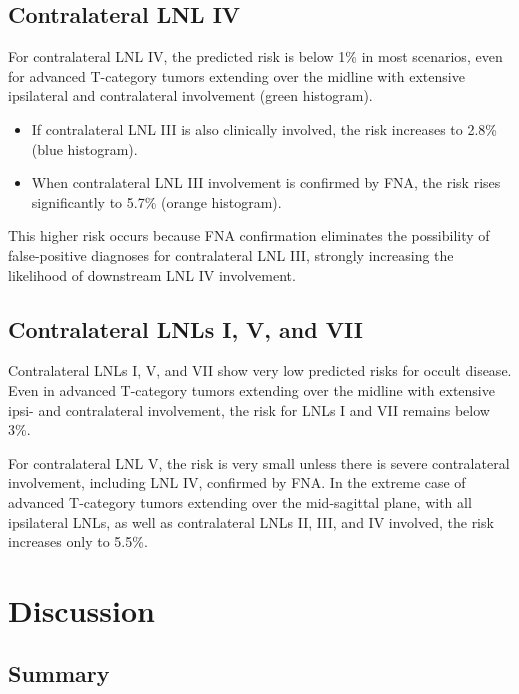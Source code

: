\documentclass[
  sn-mathphys-num,
]{sn-jnl}
\providecommand{\tightlist}{%
  \setlength{\itemsep}{0pt}\setlength{\parskip}{0pt}}\usepackage{longtable,booktabs,array}
\begin{document}
\subsection{Contralateral LNL IV}\label{contralateral-lnl-iv}

For contralateral LNL IV, the predicted risk is below 1\% in most
scenarios, even for advanced T-category tumors extending over the
midline with extensive ipsilateral and contralateral involvement (green
histogram).

\begin{itemize}
\tightlist
\item
  If contralateral LNL III is also clinically involved, the risk
  increases to 2.8\% (blue histogram).\\
\item
  When contralateral LNL III involvement is confirmed by FNA, the risk
  rises significantly to 5.7\% (orange histogram).
\end{itemize}

This higher risk occurs because FNA confirmation eliminates the
possibility of false-positive diagnoses for contralateral LNL III,
strongly increasing the likelihood of downstream LNL IV involvement.

\subsection{Contralateral LNLs I, V, and
VII}\label{contralateral-lnls-i-v-and-vii}

Contralateral LNLs I, V, and VII show very low predicted risks for
occult disease. Even in advanced T-category tumors extending over the
midline with extensive ipsi- and contralateral involvement, the risk for
LNLs I and VII remains below 3\%.

For contralateral LNL V, the risk is very small unless there is severe
contralateral involvement, including LNL IV, confirmed by FNA. In the
extreme case of advanced T-category tumors extending over the
mid-sagittal plane, with all ipsilateral LNLs, as well as contralateral
LNLs II, III, and IV involved, the risk increases only to 5.5\%.

\section{Discussion}\label{sec-discussion}

\subsection{Summary}\label{summary}
\end{document}
